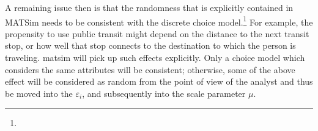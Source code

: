 \begin{oframed}
A remaining issue then is that the randomness that is explicitly contained in MATSim needs to be consistent with the discrete choice model.\footnote{
%
%
}
%
For example, the propensity to use public transit might depend on the distance to the next transit stop, or how well that stop connects to the destination to which the person is traveling.  \acrshort{matsim} will pick up such effects explicitly.  Only a choice model which considers the same attributes will be consistent; otherwise, some of the above effect will be considered as random from the point of view of the analyst and thus be moved into the $\varepsilon_i$, and subsequently into the scale parameter $\mu$.
%
%
%
%
%
%
%
\end{oframed}

